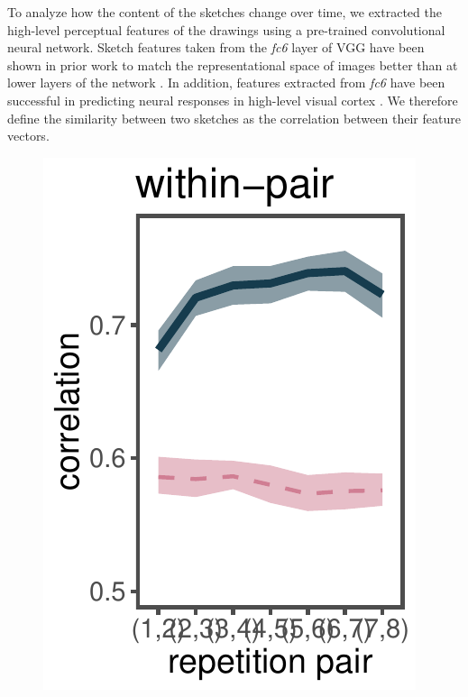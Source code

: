 \documentclass[10pt,letterpaper]{article}
\begin{document}
To analyze how the content of the sketches change over time, we extracted the high-level perceptual features of the drawings using a pre-trained convolutional neural network. 
Sketch features taken from the \textit{fc6} layer of VGG have been shown in prior work to match the representational space of images better than at lower layers of the network \cite{Fan18}. 
In addition, features extracted from \emph{fc6} have been successful in predicting neural responses in high-level visual cortex \cite{Yamins}.
We therefore define the similarity between two sketches as the correlation between their feature vectors.

\begin{figure}
\includegraphics[width=\linewidth/2-1]{figures/within.pdf}

\end{figure}
\end{document}
